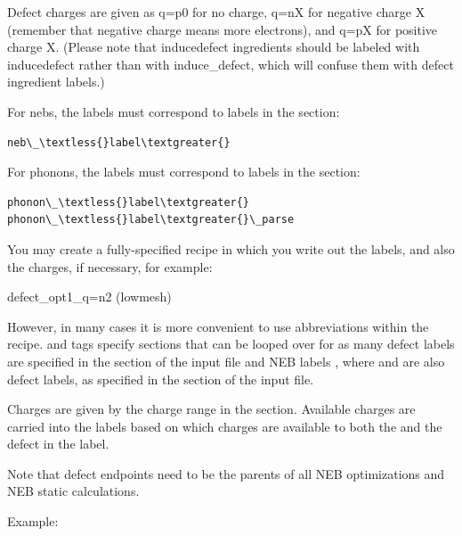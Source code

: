 \documentclass[letterpaper,10pt,english]{sphinxmanual}
\begin{document}
Defect charges are given as q=p0 for no charge, q=nX for negative charge X (remember that negative charge means more electrons), and q=pX for positive charge X.
(Please note that inducedefect ingredients should be labeled with inducedefect rather than with induce\_defect, which will confuse them with defect ingredient labels.)

For nebs, the labels must correspond to labels in the  section:

\begin{Verbatim}[commandchars=\\\{\}]
neb\_\textless{}label\textgreater{}
\end{Verbatim}

For phonons, the labels must correspond to labels in the  section:

\begin{Verbatim}[commandchars=\\\{\}]
phonon\_\textless{}label\textgreater{}
phonon\_\textless{}label\textgreater{}\_parse
\end{Verbatim}

You may create a fully-specified recipe in which you write out the labels, and also the charges, if necessary, for example:

defect\_opt1\_q=n2 (lowmesh)

However, in many cases it is more convenient to use abbreviations within the recipe.
 and  tags specify sections that can be looped over for as many defect labels  are specified in the  section of the input file and NEB labels , where  and  are also defect labels, as specified in the  section of the input file.

Charges  are given by the charge range in the  section. Available charges are carried into the  labels based on which charges are available to both the  and the  defect in the label.

Note that defect endpoints need to be the parents of all NEB optimizations and NEB static calculations.

Example:
\end{document}
